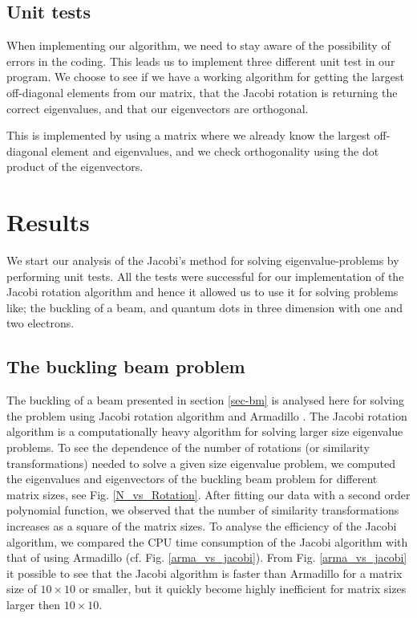 \documentclass[a4paper]{article}
\begin{document}
\subsection{Unit tests}

When implementing our algorithm, we need to stay aware of the possibility of errors in the coding. This leads us to implement three different unit test in our program. We choose to see if we have a working algorithm for getting the largest off-diagonal elements from our matrix, that the Jacobi rotation is returning the correct eigenvalues, and that our eigenvectors are orthogonal.

This is implemented by using a matrix where we already know the largest off-diagonal element and eigenvalues, and we check orthogonality using the dot product of the eigenvectors.


\section{Results}
We start our analysis of the Jacobi's method for solving eigenvalue-problems by performing unit tests. All the tests were successful for our implementation of the Jacobi rotation algorithm and hence it allowed us to use it for solving problems like; the buckling of a beam, and quantum dots in three dimension with one and two electrons.

\subsection{The buckling beam problem}
The buckling of a beam presented in section \ref{sec-bm} is analysed here for solving the problem using Jacobi rotation algorithm and Armadillo \cite{Arma}. The Jacobi rotation algorithm is a computationally heavy algorithm for solving larger size eigenvalue problems. To see the dependence of the number of rotations (or similarity transformations) needed to solve a given size eigenvalue problem, we computed the eigenvalues and eigenvectors of the buckling beam problem for different matrix sizes, see Fig. \ref{N_vs_Rotation}. After fitting our data with a second order polynomial function, we observed that the number of similarity transformations increases as a square of the matrix sizes. To analyse the efficiency of the Jacobi algorithm, we compared the CPU time consumption of the Jacobi algorithm with that of using Armadillo (cf. Fig. \ref{arma_vs_jacobi}). From Fig. \ref{arma_vs_jacobi} it possible to see that the Jacobi algorithm is faster than Armadillo for a matrix size of $10\times10$ or smaller, but it quickly become highly inefficient for matrix sizes larger then $10\times10$.
\end{document}
